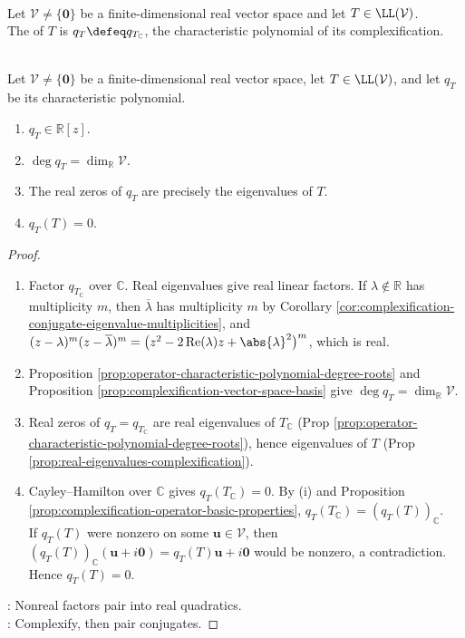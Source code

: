 \begin{definition} \label{def:real-operator-characteristic-polynomial} \\
Let $\mathcal{V}\neq\{\mathbf{0}\}$ be a finite-dimensional real vector space and let $T\in\LL(\mathcal{V})$.\\
The  of $T$ is $q_T\defeq q_{T_{\mathbb{C}}}$, the characteristic polynomial of its complexification.
\end{definition}

\begin{theorem} \label{thm:real-operator-characteristic-polynomial-properties} \\
Let $\mathcal{V}\neq\{\mathbf{0}\}$ be a finite-dimensional real vector space, let $T\in\LL(\mathcal{V})$, and let $q_T$ be its characteristic polynomial.
\begin{enumerate}[label=(\roman*)]
\setlength{\itemsep}{0pt}
\item $q_T\in\mathbb{R}[z]$.
\item $\deg q_T=\dim_{\mathbb{R}}\mathcal{V}$.
\item The real zeros of $q_T$ are precisely the eigenvalues of $T$.
\item $q_T(T)=0$.
\end{enumerate}
\begin{proof}
\begin{enumerate}[label=(\roman*)]
\setlength{\itemsep}{0pt}
\item Factor $q_{T_{\mathbb{C}}}$ over $\mathbb{C}$. Real eigenvalues give real linear factors. If $\lambda\notin\mathbb{R}$ has multiplicity $m$, then $\overline{\lambda}$ has multiplicity $m$ by Corollary \ref{cor:complexification-conjugate-eigenvalue-multiplicities}, and $(z-\lambda)^m(z-\overline{\lambda})^m=\bigl(z^2-2\operatorname{Re}(\lambda)z+\abs{\lambda}^2\bigr)^m$, which is real.
\item Proposition \ref{prop:operator-characteristic-polynomial-degree-roots} and Proposition \ref{prop:complexification-vector-space-basis} give $\deg q_T=\dim_{\mathbb{R}}\mathcal{V}$.
\item Real zeros of $q_T=q_{T_{\mathbb{C}}}$ are real eigenvalues of $T_{\mathbb{C}}$  (Prop \ref{prop:operator-characteristic-polynomial-degree-roots}), hence eigenvalues of $T$ (Prop \ref{prop:real-eigenvalues-complexification}).
\item Cayley--Hamilton over $\mathbb{C}$ gives $q_T(T_{\mathbb{C}})=0$. By (i) and Proposition \ref{prop:complexification-operator-basic-properties}, $q_T(T_{\mathbb{C}})=(q_T(T))_{\mathbb{C}}$.\\
If $q_T(T)$ were nonzero on some $\mathbf{u}\in\mathcal{V}$, then $(q_T(T))_{\mathbb{C}}(\mathbf{u}+i\mathbf{0})=q_T(T)\mathbf{u}+i\mathbf{0}$ would be nonzero, a contradiction. Hence $q_T(T)=0$.
\end{enumerate}
: Nonreal factors pair into real quadratics.\\
: Complexify, then pair conjugates.
\end{proof}
\end{theorem}

